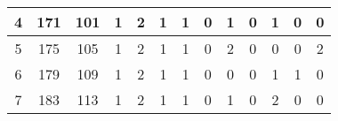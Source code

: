 \begin{sidewaystable}
\begin{tabular}{|c|c|c|c|c|c|c|c|c|c|c|c|c|}
		4                                                 & 171                                               & 101                                               & 1                                                 & 2                                                 & 1                                                 & 1                                                 & 0                                                 & 1                                                 & 0                                                 & 1                                                 & 0                                                 & 0                                                 \\ \hline
		5                                                 & 175                                               & 105                                               & 1                                                 & 2                                                 & 1                                                 & 1                                                 & 0                                                 & 2                                                 & 0                                                 & 0                                                 & 0                                                 & 2                                                 \\ \hline
		6                                                 & 179                                               & 109                                               & 1                                                 & 2                                                 & 1                                                 & 1                                                 & 0                                                 & 0                                                 & 0                                                 & 1                                                 & 1                                                 & 0                                                 \\ \hline
		7                                                 & 183                                               & 113                                               & 1                                                 & 2                                                 & 1                                                 & 1                                                 & 0                                                 & 1                                                 & 0                                                 & 2                                                 & 0                                                 & 0                                                 \\ \hline

\end{tabular}
\end{sidewaystable}
